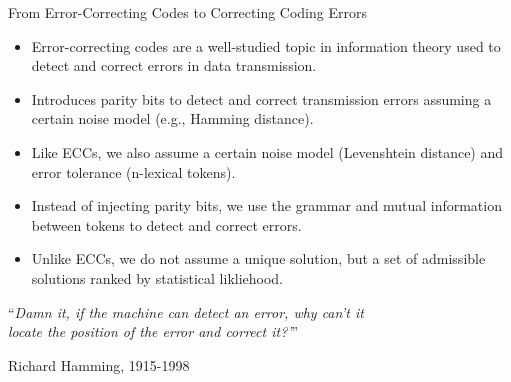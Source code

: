 \documentclass{beamer}
\begin{document}

\begin{frame}{From Error-Correcting Codes to Correcting Coding Errors}
  \begin{itemize}
    \item Error-correcting codes are a well-studied topic in information theory used to detect and correct errors in data transmission.
    \item Introduces parity bits to detect and correct transmission errors assuming a certain noise model (e.g., Hamming distance).
    \item Like ECCs, we also assume a certain noise model (Levenshtein distance) and error tolerance (n-lexical tokens).
    \item Instead of injecting parity bits, we use the grammar and mutual information between tokens to detect and correct errors.
    \item Unlike ECCs, we do not assume a unique solution, but a set of admissible solutions ranked by statistical likliehood.
    \end{itemize}
  \setlength{\epigraphwidth}{0.97\textwidth}
  \epigraph{``\textit{Damn it, if the machine can detect an error, why can't it\\\phantom{``}locate the position of the error and correct it?'}''}{Richard Hamming, 1915-1998}
\end{frame}
\end{document}
